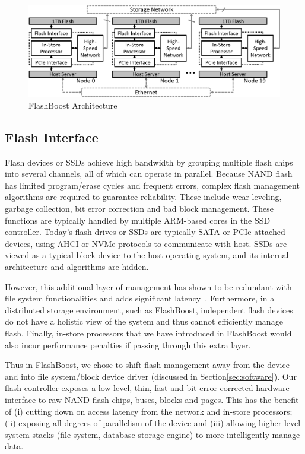 \begin{figure}[ht]
	\begin{center}
	\includegraphics[width=0.8\paperwidth]{figures/architecture.pdf}
	\caption{FlashBoost Architecture}
	\label{fig:architecture}
	\end{center}
\end{figure}

\subsection{Flash Interface}

Flash devices or SSDs achieve high bandwidth by grouping multiple flash chips
into several channels, all of which can operate in parallel. Because NAND flash
has limited program/erase cycles and frequent errors, complex flash management
algorithms are required to guarantee reliability. These include wear leveling,
garbage collection, bit error correction and bad block management. These
functions are typically handled by multiple ARM-based cores in the SSD
controller.  Today's flash drives or SSDs are typically SATA or PCIe attached
devices, using AHCI or NVMe protocols to communicate with host. SSDs are viewed
as a typical block device to the host operating system, and its internal
architecture and algorithms are hidden. 

However, this additional layer of management has shown to be redundant with
file system functionalities and adds significant latency~\cite{redo}.
Furthermore, in a distributed storage environment, such as FlashBoost,
independent flash devices do not have a holistic view of the system and thus
cannot efficiently manage flash. Finally, in-store processors that we have
introduced in FlashBoost would also incur performance penalties if passing
through this extra layer. 

Thus in FlashBoost, we chose to shift flash management
away from the device and into file system/block device driver (discussed in
Section\ref{sec:software}). Our flash controller exposes a low-level, thin,
fast and bit-error corrected hardware interface to raw NAND flash chips, buses,
blocks and pages. This has the benefit of (i) cutting down on access latency
from the network and in-store processors; (ii) exposing all degrees of
parallelism of the device and (iii) allowing higher level system stacks (file
system, database storage engine) to more intelligently manage data. 

